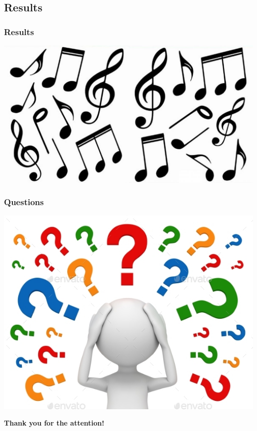 \documentclass[12pt]{beamer}
\begin{document}
            \subsection{Results}
            \begin{frame}
                \frametitle{Results}
                \includegraphics[scale=0.3]{notes}
            \end{frame}
            \begin{frame}
                \frametitle{Questions}
                \begin{center}
                    \includegraphics[scale=0.5]{questions}
                \end{center}
            \end{frame}
            \begin{frame}
                \begin{center}
                    {\LARGE \textbf{Thank you for the attention!}}
                \end{center}
            \end{frame}
\end{document}
